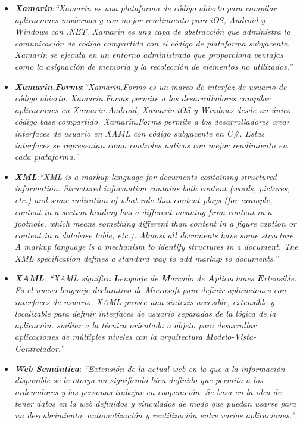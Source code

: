 \begin{itemize}
    \item \textbf{\textit{Xamarin}}:\textit{“Xamarin es una plataforma de código abierto para compilar aplicaciones modernas 
    y con mejor rendimiento para iOS, Android y Windows con .NET. Xamarin es una capa de abstracción que administra la 
    comunicación de código compartido con el código de plataforma subyacente. Xamarin se ejecuta en un entorno administrado 
    que proporciona ventajas como la asignación de memoria y la recolección de elementos no utilizados.”} \autocite*{Xamarin}
    
    \item \textbf{\textit{Xamarin.Forms}}:\textit{“Xamarin.Forms es un marco de interfaz de usuario de código abierto. 
    Xamarin.Forms permite a los desarrolladores compilar aplicaciones en Xamarin.Android, Xamarin.iOS y Windows desde 
    un único código base compartido. Xamarin.Forms permite a los desarrolladores crear interfaces de usuario en XAML 
    con código subyacente en C\#. Estas interfaces se representan como controles nativos con mejor rendimiento en cada plataforma.”}
    \autocite*{XamarinForms}
    
    \item \textbf{\textit{XML}}:\textit{“XML is a markup language for documents containing structured information. 
    Structured information contains both content (words, pictures, etc.) and some indication of what role that content 
    plays (for example, content in a section heading has a different meaning from content in a footnote, which means something
    different than content in a figure caption or content in a database table, etc.). Almost all documents have some structure.
    A markup language is a mechanism to identify structures in a document. The XML specification defines a standard way to add 
    markup to documents.”} \autocite*{Walsh}

    \item \textbf{\textit{XAML}}: \textit{“XAML significa \textbf{L}enguaje de \textbf{M}arcado de \textbf{A}plicaciones 
    \textbf{E}xtensible. Es el nuevo lenguaje declarativo de Microsoft para definir aplicaciones con interfaces de usuario.
    XAML provee una sintexis accesible, extensible y localizable para definir interfaces de usuario separadas de la lógica de 
    la aplicación. smiliar a la técnica orientada a objeto para desarrollar aplicaciones de múltiples niveles con la arquitectura 
    Modelo-Vista-Controlador.”} \autocite*{MacVittieA.2006}
    
    \item \textbf{\textit{Web Semántica}}: \textit{“Extensión de la actual 
    web en la que a la información disponible se le otorga un significado 
    bien definido que permita a los ordenadores y las personas trabajar en 
    cooperación. Se basa en la idea de tener datos en la web definidos y 
    vinculados de modo que puedan usarse para un descubrimiento, 
    automatización y reutilización entre varias aplicaciones.”} \autocite*{Hendler2002}

\end{itemize}
